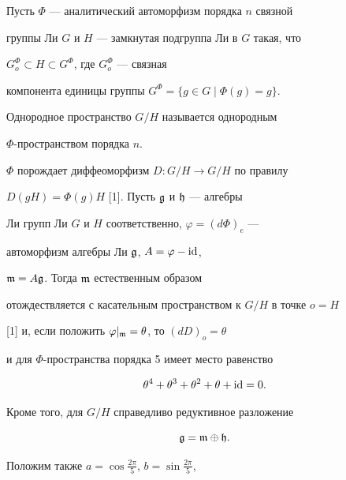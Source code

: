 Пусть $\Phi$ --- аналитический автоморфизм порядка $n$ связной


группы Ли $G$ и $H$ --- замкнутая подгруппа Ли в $G$ такая, что


$G_o^\Phi \subset H \subset G^\Phi$, где $G_o^\Phi$ --- связная


компонента единицы группы $G^\Phi=\{g\in G \mid \Phi(g)=g \}$.





\begin{defn}


Однородное пространство $G/H$ называется однородным


$\Phi$-прост\-ран\-ст\-вом порядка $n$.


\end{defn}





$\Phi$ порождает диффеоморфизм $D:G/H\rightarrow G/H$ по правилу


$D(gH)=\Phi(g)H$ [1]. Пусть $\frak{g}$ и $\frak{h}$ --- алгебры


Ли групп Ли $G$ и $H$ соответственно, $\varphi = (d\Phi)_e$ ---


автоморфизм алгебры Ли $\frak{g}$, $A=\varphi - \operatorname{id}$,


$\frak{m}=A\frak{g}$. Тогда $\frak{m}$ естественным образом


отождествляется с касательным пространством к $G/H$ в точке $o=H$


[1] и, если положить $\varphi|_{\frak{m}}=\theta$, то $(dD)_o=\theta$


и для $\Phi$-пространства порядка 5 имеет место равенство


\begin{equation}\label{1}


\theta^4+\theta^3+\theta^2+\theta+\id=0.


\end{equation}





Кроме того, для $G/H$ справедливо редуктивное разложение


\begin{equation}\label{2}


\frak{g}=\frak{m}\oplus \frak{h}.


\end{equation}


Положим также $a=\cos\frac{2\pi}{5}$, $b=\sin\frac{2\pi}{5}$,


